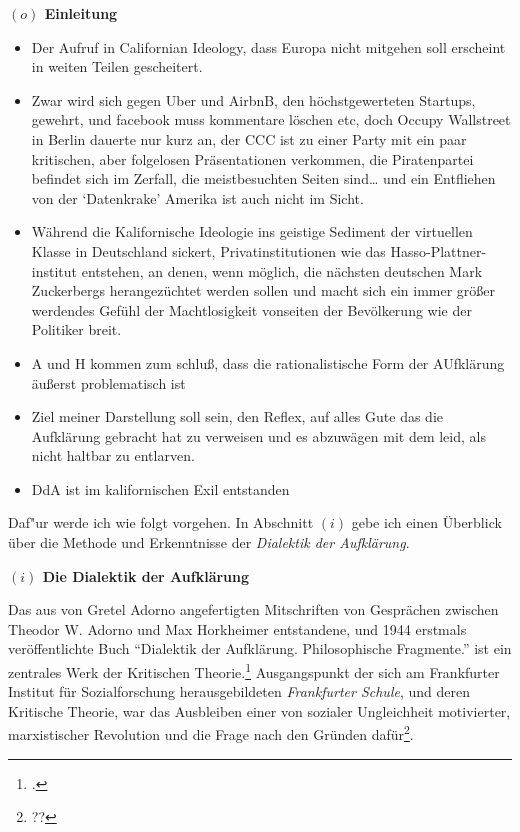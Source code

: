 \documentclass[a4paper, 12pt]{article}
\begin{document}
\begin{onehalfspace} 

\noindent\textbf{$(o)$ Einleitung}

\noindent %

\begin{itemize}
  \item Der Aufruf in Californian Ideology, dass Europa nicht mitgehen soll erscheint in weiten Teilen gescheitert. 
  \item Zwar wird sich gegen Uber und AirbnB, den höchstgewerteten Startups, gewehrt, und facebook muss kommentare löschen etc, doch Occupy Wallstreet in Berlin dauerte nur kurz an, der CCC ist zu einer Party mit ein paar kritischen, aber folgelosen Präsentationen verkommen, die Piratenpartei befindet sich im Zerfall, die meistbesuchten Seiten sind… und ein Entfliehen von der ‘Datenkrake’ Amerika ist auch nicht im Sicht. 
\item Während die Kalifornische Ideologie ins geistige Sediment der virtuellen Klasse in Deutschland sickert, Privatinstitutionen wie das Hasso-Plattner-institut entstehen, an denen, wenn möglich, die nächsten deutschen Mark Zuckerbergs herangezüchtet werden sollen und macht sich ein immer größer werdendes Gefühl der Machtlosigkeit vonseiten der Bevölkerung wie der Politiker breit.
\item A und H kommen zum schluß, dass die rationalistische Form der AUfklärung äußerst problematisch ist
\item Ziel meiner Darstellung soll sein, den Reflex, auf alles Gute das die Aufklärung gebracht hat zu verweisen und es abzuwägen mit dem leid, als nicht haltbar zu entlarven.
\item DdA ist im kalifornischen Exil entstanden
\end{itemize}


Daf"ur werde ich wie folgt vorgehen. In Abschnitt $(i)$ gebe ich einen Überblick über die Methode und Erkenntnisse der \emph{Dialektik der Aufklärung}. 

\vspace{5mm}

\noindent\textbf{$(i)$ Die Dialektik der Aufklärung}

\noindent Das aus von Gretel Adorno angefertigten Mitschriften von Gesprächen zwischen Theodor W. Adorno und Max Horkheimer entstandene, und 1944 erstmals veröffentlichte Buch "`Dialektik der Aufklärung. Philosophische Fragmente."' ist ein zentrales Werk der Kritischen Theorie.\footnote{\Cite[Vgl.][S. 249]{jaeggi}.} Ausgangspunkt der sich am Frankfurter Institut für Sozialforschung herausgebildeten \emph{Frankfurter Schule}, und deren Kritische Theorie, war das Ausbleiben einer von sozialer Ungleichheit motivierter, marxistischer Revolution und die Frage nach den Gründen dafür\footnote{??}. 











\end{onehalfspace}
\end{document}
